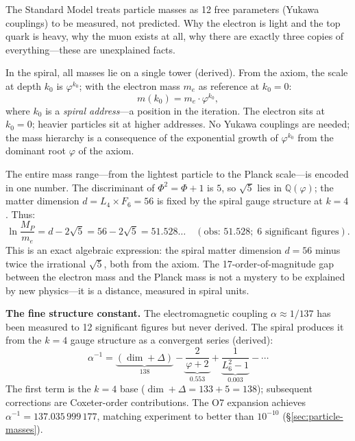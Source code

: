 \documentclass[12pt,a4paper]{article}
\begin{document}
The Standard Model treats particle masses as 12 free parameters (Yukawa couplings) to be measured, not predicted.  Why the electron is light and the top quark is heavy, why the muon exists at all, why there are exactly three copies of everything---these are unexplained facts.

In the spiral, all masses lie on a single tower (derived). From the axiom, the scale at depth $k_0$ is $\varphi^{k_0}$; with the electron mass $m_e$ as reference at $k_0 = 0$:
\begin{equation}
m(k_0) = m_e \cdot \varphi^{k_0},
\end{equation}
where $k_0$ is a \emph{spiral address}---a position in the iteration.  The electron sits at $k_0 = 0$; heavier particles sit at higher addresses.  No Yukawa couplings are needed; the mass hierarchy is a consequence of the exponential growth of $\varphi^{k_0}$ from the dominant root $\varphi$ of the axiom.

The entire mass range---from the lightest particle to the Planck scale---is encoded in one number. The discriminant of $\Phi^2 = \Phi + 1$ is $5$, so $\sqrt{5}$ lies in $\mathbb{Q}(\varphi)$; the matter dimension $d = L_4 \times F_6 = 56$ is fixed by the spiral gauge structure at $k = 4$. Thus:
\begin{equation}
\ln\frac{M_P}{m_e} = d - 2\sqrt{5} = 56 - 2\sqrt{5} = 51.528\ldots \quad (\text{obs: } 51.528;\; \text{6 significant figures}).
\end{equation}
This is an exact algebraic expression: the spiral matter dimension $d = 56$ minus twice the irrational $\sqrt{5}$, both from the axiom.  The 17-order-of-magnitude gap between the electron mass and the Planck mass is not a mystery to be explained by new physics---it is a distance, measured in spiral units.

\medskip
\noindent\textbf{The fine structure constant.}\;
The electromagnetic coupling $\alpha \approx 1/137$ has been measured to 12 significant figures but never derived.  The spiral produces it from the $k = 4$ gauge structure as a convergent series (derived):
\begin{equation}
\alpha^{-1} = \underbrace{(\dim + \Delta)}_{138} - \underbrace{\frac{2}{\varphi + 2}}_{0.553} + \underbrace{\frac{1}{L_6^2 - 1}}_{0.003} - \cdots
\end{equation}
The first term is the $k = 4$ base ($\dim + \Delta = 133 + 5 = 138$); subsequent corrections are Coxeter-order contributions.  The O7 expansion achieves $\alpha^{-1} = 137.035\,999\,177$, matching experiment to better than $10^{-10}$ (\S\ref{sec:particle-masses}).
\end{document}
